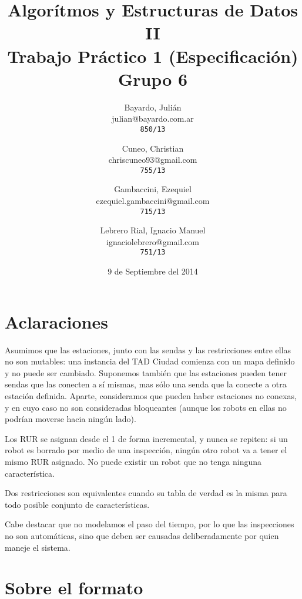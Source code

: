 \documentclass[a4paper,titlepage]{article}
\begin{document}
\title{Algorítmos y Estructuras de Datos II\\
Trabajo Práctico 1 (Especificación)\\
Grupo 6}

\author{
	Bayardo, Julián\\
	julian@bayardo.com.ar\\
	\texttt{850/13}
	\and
	Cuneo, Christian\\
	chriscuneo93@gmail.com\\
	\texttt{755/13}
	\and
	Gambaccini, Ezequiel\\
	ezequiel.gambaccini@gmail.com\\
	\texttt{715/13}
	\and
	Lebrero Rial, Ignacio Manuel\\
	ignaciolebrero@gmail.com\\
	\texttt{751/13}
}

\date{9 de Septiembre del 2014}

\maketitle

\section{Aclaraciones}

Asumimos que las estaciones, junto con las sendas y las restricciones entre ellas no son mutables: una instancia del TAD Ciudad comienza con un mapa definido y no puede ser cambiado. Suponemos también que las estaciones pueden tener sendas que las conecten a sí mismas, mas sólo una senda que la conecte a otra estación definida. Aparte, consideramos que pueden haber estaciones no conexas, y en cuyo caso no son consideradas bloqueantes (aunque los robots en ellas no podrían moverse hacia ningún lado).

Los RUR se asignan desde el 1 de forma incremental, y nunca se repiten: si un robot es borrado por medio de una inspección, ningún otro robot va a tener el mismo RUR asignado. No puede existir un robot que no tenga ninguna característica.

Dos restricciones son equivalentes cuando su tabla de verdad es la misma para todo posible conjunto de características.

Cabe destacar que no modelamos el paso del tiempo, por lo que las inspecciones no son automáticas, sino que deben ser causadas deliberadamente por quien maneje el sistema.

\section{Sobre el formato}
\end{document}
